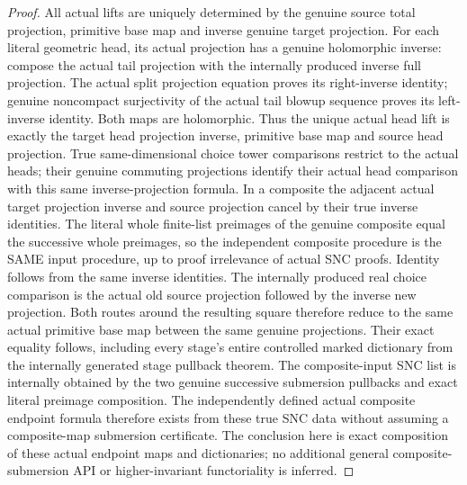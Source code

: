 \begin{proof}
All actual lifts are uniquely determined by the genuine source total
projection, primitive base map and inverse genuine target projection.
For each literal geometric head, its actual projection has a genuine
holomorphic inverse: compose the actual tail projection with the internally
produced inverse full projection. The actual split projection equation
proves its right-inverse identity; genuine noncompact surjectivity of the
actual tail blowup sequence proves its left-inverse identity. Both maps
are holomorphic. Thus the unique actual head lift is exactly the target
head projection inverse, primitive base map and source head projection.
True same-dimensional choice tower comparisons restrict to the actual
heads; their genuine commuting projections identify their actual head
comparison with this same inverse-projection formula.
In a composite the adjacent actual target projection inverse and source
projection cancel by their true inverse identities. The literal whole
finite-list preimages of the genuine composite equal the successive whole
preimages, so the independent composite procedure is the SAME input
procedure, up to proof irrelevance of actual SNC proofs. Identity follows
from the same inverse identities. The internally produced real choice
comparison is the actual old source projection followed by the inverse
new projection. Both routes around the resulting square therefore reduce
to the same actual primitive base map between the same genuine projections.
Their exact equality follows, including every stage's entire controlled
marked dictionary from the internally generated stage pullback theorem.
The composite-input SNC list is internally obtained by the two genuine
successive submersion pullbacks and exact literal preimage composition.
The independently defined actual composite endpoint formula therefore
exists from these true SNC data without assuming a composite-map submersion
certificate. The conclusion here is exact composition of these actual
endpoint maps and dictionaries; no additional general composite-submersion
API or higher-invariant functoriality is inferred.
\end{proof}

